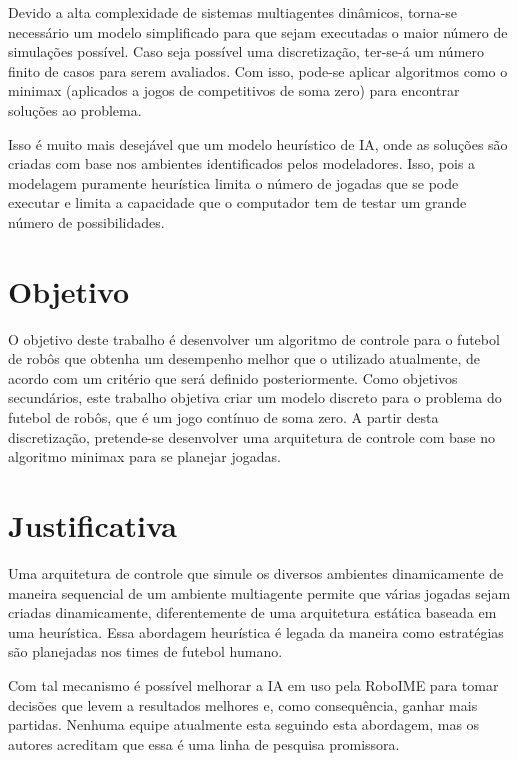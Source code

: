 Devido a alta complexidade de sistemas multiagentes dinâmicos, torna-se
necessário um modelo simplificado para que sejam executadas o maior número de
simulações possível.  Caso seja possível uma discretização, ter-se-á um número
finito de casos para serem avaliados. Com isso, pode-se aplicar algoritmos como
o minimax (aplicados a jogos de competitivos de soma zero) para encontrar
soluções ao problema.

Isso é muito mais desejável que um modelo heurístico de IA, onde as soluções são
criadas com base nos ambientes identificados pelos modeladores. Isso, pois a
modelagem puramente heurística limita o número de jogadas que se pode executar e
limita a capacidade que o computador tem de testar um grande número de possibilidades.

\section{Objetivo}

O objetivo deste trabalho é desenvolver um algoritmo de controle para o futebol
de robôs que obtenha um desempenho melhor que o utilizado atualmente, de acordo
com um critério que será definido posteriormente.
Como objetivos secundários, este trabalho objetiva criar um modelo discreto para
o problema do futebol de robôs, que é um jogo contínuo de soma zero.
A partir desta discretização, pretende-se desenvolver uma arquitetura de
controle com base no algoritmo minimax para se planejar jogadas.

\section{Justificativa}

Uma arquitetura de controle que simule os diversos ambientes dinamicamente de
maneira sequencial de um ambiente multiagente permite que várias jogadas sejam
criadas dinamicamente, diferentemente de uma arquitetura estática baseada em uma
heurística. Essa abordagem heurística é legada da maneira como estratégias são
planejadas nos times de futebol humano.

Com tal mecanismo é possível melhorar a IA em uso pela RoboIME para tomar
decisões que levem a resultados melhores e, como consequência, ganhar mais
partidas. Nenhuma equipe atualmente esta seguindo esta abordagem, mas os autores
acreditam que essa é uma linha de pesquisa promissora.

